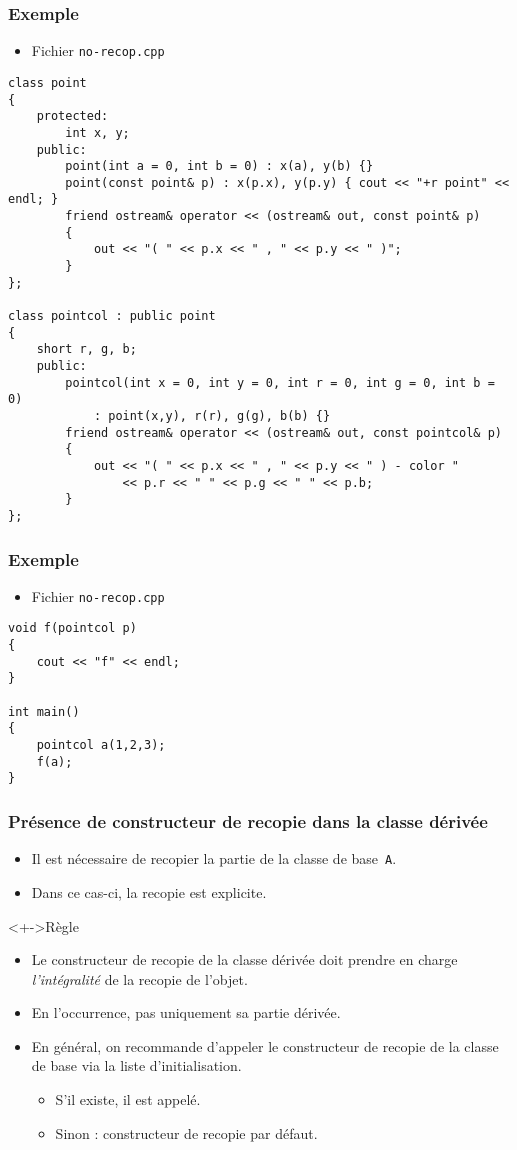 \begin{frame}[containsverbatim]
\frametitle{Exemple}
\begin{itemize}
\item Fichier \texttt{no-recop.cpp}
\end{itemize}
\begin{lstlisting}
class point
{
	protected:
		int x, y;	
	public:
		point(int a = 0, int b = 0) : x(a), y(b) {}
		point(const point& p) : x(p.x), y(p.y) { cout << "+r point" << endl; }
		friend ostream& operator << (ostream& out, const point& p)
		{ 
			out << "( " << p.x << " , " << p.y << " )"; 
		}
};

class pointcol : public point
{
	short r, g, b;	
	public:
		pointcol(int x = 0, int y = 0, int r = 0, int g = 0, int b = 0) 
			: point(x,y), r(r), g(g), b(b) {}
		friend ostream& operator << (ostream& out, const pointcol& p)
		{ 
			out << "( " << p.x << " , " << p.y << " ) - color " 
			    << p.r << " " << p.g << " " << p.b; 
		}
};
\end{lstlisting}
\end{frame}

\begin{frame}[containsverbatim]
\frametitle{Exemple}
\begin{itemize}
\item Fichier \texttt{no-recop.cpp}
\end{itemize}
\begin{lstlisting}
void f(pointcol p) 
{ 
	cout << "f" << endl; 
}

int main()
{
	pointcol a(1,2,3);
	f(a);
}
\end{lstlisting}
\end{frame}

\begin{frame}
\frametitle{Présence de constructeur de recopie dans la classe dérivée}
\begin{itemize}[<+->]
\item Il est nécessaire de recopier la partie de la classe de base~\texttt{A}.
\item Dans ce cas-ci, la recopie est explicite.
\end{itemize}
\begin{exampleblock}<+->{Règle}
\begin{itemize}[<+->]
\item Le constructeur de recopie de la classe dérivée doit prendre en charge \emph{l'intégralité} de la recopie de l'objet.
\end{itemize}
\end{exampleblock}
\begin{itemize}[<+->]
\item En l’occurrence, pas uniquement sa partie dérivée.
\item En général, on recommande d'appeler le constructeur de recopie de la classe de base via la liste d'initialisation.
	\begin{itemize}
	\item S'il existe, il est appelé.
	\item Sinon : constructeur de recopie par défaut.
	\end{itemize}
\end{itemize}
\end{frame}

